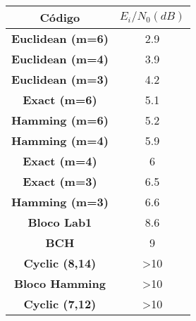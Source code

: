 \begin{table}[H]
	\centering
	\captionsetup{font=scriptsize}
	\begin{tabular}{c|c}
	\textbf{Código} & \textbf{$E_{i}/N_{0} (dB)$} \\ \hline
	\textbf{Euclidean (m=6)} & 2.9 \\
	\textbf{Euclidean (m=4)} & 3.9 \\
	\textbf{Euclidean (m=3)} & 4.2 \\
	\textbf{Exact (m=6)} & 5.1 \\
	\textbf{Hamming (m=6)} & 5.2 \\
	\textbf{Hamming (m=4)} & 5.9 \\
	\textbf{Exact (m=4)} & 6 \\
	\textbf{Exact (m=3)} & 6.5 \\
	\textbf{Hamming (m=3)} & 6.6 \\
	\textbf{Bloco Lab1} & 8.6 \\
	\textbf{BCH} & 9 \\
	\textbf{Cyclic (8,14)} & \textgreater{}10 \\
	\textbf{Bloco Hamming} & \textgreater{}10 \\
	\textbf{Cyclic (7,12)} & \textgreater{}10
\end{tabular}
\end{table}